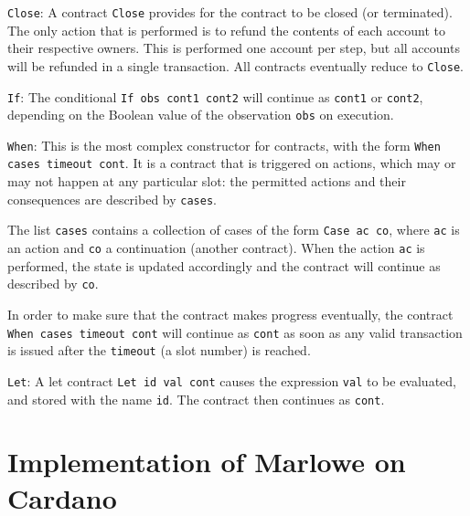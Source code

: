 \documentclass[runningheads]{llncs}
\begin{document}
\texttt{Close}: A contract \texttt{Close} provides for the contract to be closed (or terminated). The only action that is performed is to refund the contents of each account to their respective owners. This is performed one account per step, but all accounts will be refunded in a single transaction. All contracts eventually reduce to \texttt{Close}.


\texttt{If}: The conditional \texttt{If obs cont1 cont2} will continue as \texttt{cont1} or \texttt{cont2}, depending on the Boolean value of the observation \texttt{obs} on execution.

\texttt{When}: This is the most complex constructor for contracts, with the form \texttt{When cases timeout cont}. It is a contract that is triggered on actions, which may or may not happen at any particular slot: the permitted actions and their consequences are described by \texttt{cases}.

The list \texttt{cases} contains a collection of cases of the form \texttt{Case ac co}, where \texttt{ac} is an action and \texttt{co} a continuation (another contract). When the action \texttt{ac} is performed, the state is updated accordingly and the contract will continue as described by \texttt{co}.

In order to make sure that the contract makes progress eventually, the contract \texttt{When cases timeout cont} will continue as \texttt{cont} as soon as any valid transaction is issued after the \texttt{timeout} (a slot number) is reached.

\texttt{Let}: A let contract \texttt{Let id val cont} causes the expression \texttt{val} to be evaluated, and stored with the name \texttt{id}. The contract then continues as \texttt{cont}.






\section{Implementation of Marlowe on Cardano}
\label{sec:implementation}
\end{document}
